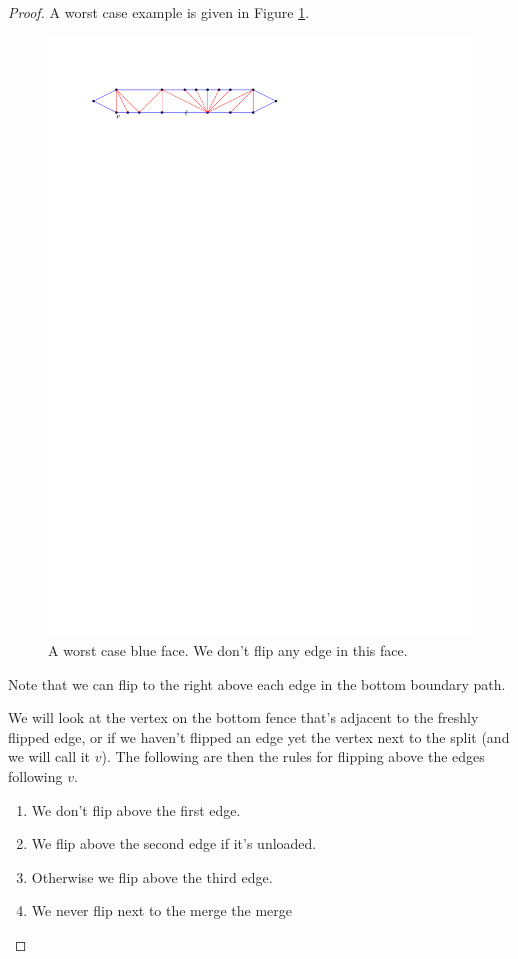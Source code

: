 \begin{proof}
  A worst case example is given in Figure \ref{fig:subdiv:worstCase}.

  \begin{figure}[h]
    \centering
    \includegraphics[scale=1]{blueFaceSubdivision/img/worstCase}
    \caption{A worst case blue face. We don't flip any edge in this face.}
    \label{fig:subdiv:worstCase}
  \end{figure}

  Note that we can flip to the right above each edge in the bottom boundary path.

  We will look at the vertex on the bottom fence that's adjacent to the freshly flipped edge, or if we haven't flipped an edge yet the vertex next to the split (and we will call it $v$). The following are then the rules for flipping above the edges following $v$.
  \begin{enumerate}
    \item We don't flip above the first edge.
    \item We flip above the second edge if it's unloaded.
    \item Otherwise we flip above the third edge.
    \item We never flip next to the merge the merge
  \end{enumerate}


\end{proof}
